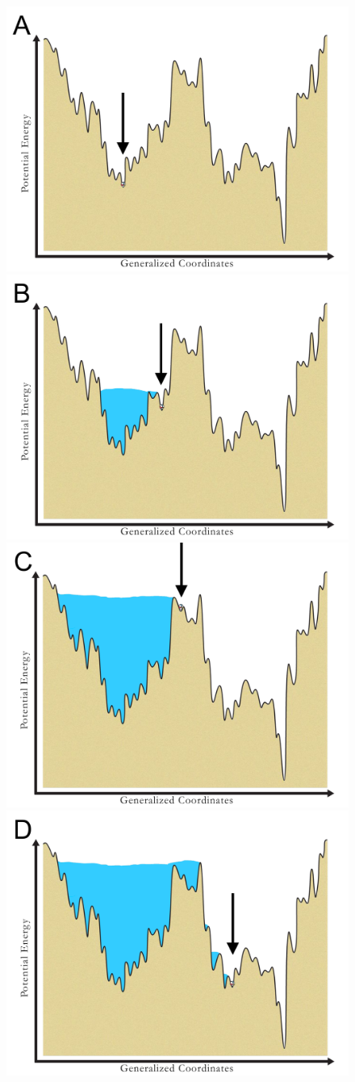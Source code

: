 \begin{figure}
	\centering
	\includegraphics[width = .45\textwidth]{./Figures/MTD/MTD_1.pdf}
	\includegraphics[width = .45\textwidth]{./Figures/MTD/MTD_2.pdf}
	\\
	\vspace{5mm}
	\includegraphics[width = .45\textwidth]{./Figures/MTD/MTD_3.pdf}
	\includegraphics[width = .45\textwidth]{./Figures/MTD/MTD_4.pdf}

\end{figure}
